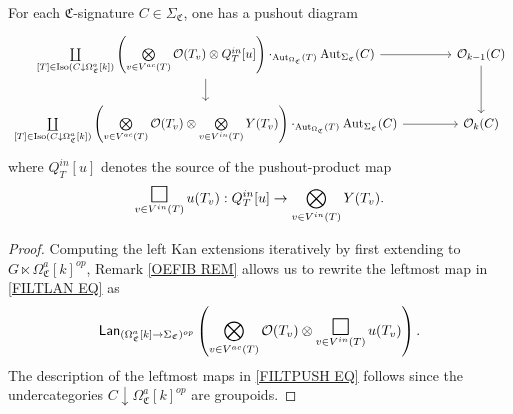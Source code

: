 \documentclass[a4paper,10pt
,draft
]{article}%
\renewcommand{\1}{\eta}%
\newcommand{\SC}{\Sigma_{\mathfrak C}}
\newcommand{\OC}{\Omega_{\mathfrak C}}
\begin{document}
\begin{proposition}
      \label{FILTPUSH PROP}
For each $\mathfrak C$-signature $C \in \Sigma_{\mathfrak C}$, one has a pushout diagram
      \vspace{-10pt}
\begin{align}\label{FILTPUSH EQ}
\begin{tikzcd}[ampersand replacement=\&]
	\mathop{\coprod}\limits_{[T] \in \Iso(C \downarrow \Omega_{\mathfrak C}^a[k])}
	\left(
		\mathop{\bigotimes}\limits_{v \in V^{ac}(T)} \O(T_v) \otimes
		Q^{in}_T[u]
	\right) \cdot_{\Aut_{\OC} (T)} \Aut_{\SC}(C)
		\arrow[r] \arrow[d]
\&[15pt]
	\O_{k-1}(C) \arrow[d]
\\                  
	\mathop{\coprod}\limits_{[T] \in \Iso(C \downarrow \Omega_{\mathfrak C}^a[k])}
	\left(
		\mathop{\bigotimes}\limits_{v \in V^{ac}(T)} \O(T_v) \otimes
		\mathop{\bigotimes}\limits_{v \in V^{in}(T)} Y(T_v)
	\right) \cdot_{\Aut_{\OC}(T)} \Aut_{\SC}(C)
		\arrow[r]
\&
\O_k(C)
\end{tikzcd}
\end{align}
      where $Q^{in}_T[u]$ denotes the source of the pushout-product map
      \begin{equation}
            \mathop{\mathlarger{\mathlarger{\mathlarger{\square}}}}_{v \in V^{in}(T)} u(T_v): Q^{in}_T[u] \to \bigotimes_{v \in V^{in}(T)} Y(T_v).
      \end{equation}
\end{proposition}

\begin{proof}
Computing the left Kan extensions iteratively by first extending to
$G \ltimes \OC^a[k]^{op}$, 
Remark \ref{OEFIB REM} allows us to rewrite 
the leftmost map in \eqref{FILTLAN EQ} as
\begin{equation}\label{FILTLANFIN EQ}
	\mathsf{Lan}_{(\OC^a[k] \to \SC)^{op}}\left(
		\bigotimes_{v \in V^{ac}(T)}\O(T_v) \otimes
		\mathop{\mathlarger{\mathlarger{\mathlarger{\square}}}}\limits_{v \in V^{in}(T)} u(T_v)
		\right).
\end{equation}
	The description of the leftmost maps in \eqref{FILTPUSH EQ} follows since the undercategories
	$C \downarrow \OC^a[k]^{op}$ are groupoids.
\end{proof}
\end{document}
